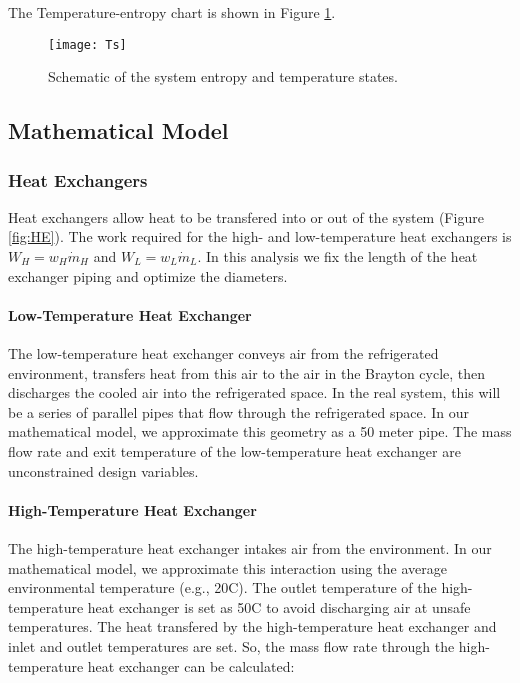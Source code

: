 \documentclass{article}
\begin{document}
The Temperature-entropy chart is shown in Figure \ref{Ts}.

\begin{figure}[htb!]
\centering
\texttt{[image: Ts]}
\caption{\label{Ts} Schematic of the system entropy and temperature states.}
\end{figure}

\subsection{Mathematical Model}


\subsubsection{Heat Exchangers}
Heat exchangers allow heat to be transfered into or out of the system (Figure \ref{fig:HE}). The work required for the high- and low-temperature heat exchangers is $W_H =w_H \dot{m}_H$ and $W_L =w_L \dot{m}_L$. In this analysis we fix the length of the heat exchanger piping and optimize the diameters.

\paragraph{Low-Temperature Heat Exchanger}
The low-temperature heat exchanger conveys air from the refrigerated environment, transfers heat from this air to the air in the Brayton cycle, then discharges the cooled air into the refrigerated space. In the real system, this will be a series of parallel pipes that flow through the refrigerated space. In our mathematical model, we approximate this geometry as a 50 meter pipe. The mass flow rate and exit temperature of the low-temperature heat exchanger are unconstrained design variables.

\paragraph{High-Temperature Heat Exchanger}
The high-temperature heat exchanger intakes air from the environment. In our mathematical model, we approximate this interaction using the average environmental temperature (e.g., 20\degree C). The outlet temperature of the high-temperature heat exchanger is set as 50\degree C to avoid discharging air at unsafe temperatures. The heat transfered by the high-temperature heat exchanger and inlet and outlet temperatures are set. So, the mass flow rate through the high-temperature heat exchanger can be calculated:
\end{document}
